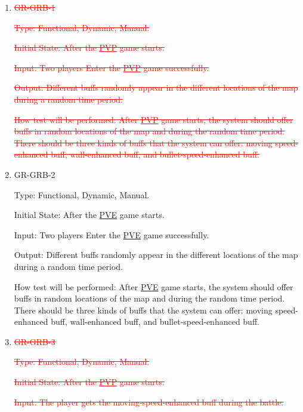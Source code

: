 \documentclass[12pt, titlepage]{article}
\begin{document}
\begin{enumerate}

\item{\textcolor{red}{\sout{GR-GRB-1}}\\}

\textcolor{red}{\sout{Type: Functional, Dynamic, Manual.}}
					
\textcolor{red}{\sout{Initial State: After the \underline{PVP} game starts. }}
					
\textcolor{red}{\sout{Input: Two players Enter the \underline{PVP} game successfully.}}
					
\textcolor{red}{\sout{Output: Different buffs randomly appear in the different locations of the map during a random time period.}}
					
\textcolor{red}{\sout{How test will be performed: After \underline{PVP} game starts, the system should offer buffs in random locations of the map and during the random time period. There should be three kinds of buffs that the system can offer: moving speed-enhanced buff, wall-enhanced buff, and bullet-speed-enhanced buff.}}

\item{GR-GRB-2\\}

Type: Functional, Dynamic, Manual.
					
Initial State: After the \underline{PVE} game starts. 
					
Input: Two players Enter the \underline{PVE} game successfully.
					
Output: Different buffs randomly appear in the different locations of the map during a random time period.
					
How test will be performed: After \underline{PVE} game starts, the system should offer buffs in random locations of the map and during the random time period. There should be three kinds of buffs that the system can offer: moving speed-enhanced buff, wall-enhanced buff, and bullet-speed-enhanced buff.

\item{\textcolor{red}{\sout{GR-GRB-3}}\\}

\textcolor{red}{\sout{Type: Functional, Dynamic, Manual.}}
					
\textcolor{red}{\sout{Initial State: After the \underline{PVP} game starts. }}
					
\textcolor{red}{\sout{Input: The player gets the moving-speed-enhanced buff during the battle.}}
					

\end{enumerate}
\end{document}
